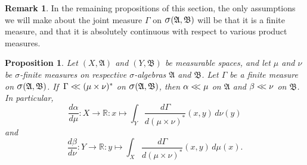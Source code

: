 \documentclass[
twoside=true,
paper=letter,
fontsize=9pt,
pagesize=auto,
leqno,
openany,
headsepline,
overfullrule,
]{scrbook}
\theoremstyle{plain}
\theoremstyle{plain}
\newtheorem{prop}[thm]{Proposition}
\theoremstyle{definition}
\newtheorem{rmk}[thm]{Remark}
\theoremstyle{bfnoteitalic}
\theoremstyle{bfnoteroman}
\newcommand{\sigalg}[1]{\mathfrak{#1}}
\newcommand{\sagb}{\mathop{\hbox{\large{$\sigma$}}}\nolimits}
\newcommand{\textsigma}{\hbox{\large{$\sigma$}}\kern-1pt}
\newcommand{\R}{\mathbb{R}}
\newcommand{\sigmaalgebra}{\sigalg{A}}
\newcommand{\sigmaalgebraii}{\sigalg{B}}
\newcommand{\productsig}[2]{\sagb(#1,#2)}
\newcommand{\measurespace}{X}
\newcommand{\measurespaceii}{Y}
\newcommand{\mspaceelt}{x}
\newcommand{\mspaceeltii}{y}
\newcommand{\abscont}{\mathrel{< \kern-3.5pt <}}
\newcommand{\measure}{\mu}
\newcommand{\measmu}{\mu}
\newcommand{\measureii}{\nu}
\newcommand{\measnu}{\nu}
\newcommand{\joint}{\Gamma}%
\newcommand{\measonprod}{\Gamma}%
\newcommand{\marginalone}{\alpha}%
\newcommand{\marginaltwo}{\beta}%
\begin{document}
\begin{rmk}
In the remaining propositions of this section,
the only assumptions we will make about the joint measure $\measonprod$ on $\productsig{\sigmaalgebra}{\sigmaalgebraii}$ will be that it is a finite measure, and that it is absolutely continuous with respect to various product measures.
\end{rmk}






\begin{prop}\label{reference_implies_marginals}
Let 
$(\measurespace, \sigmaalgebra)$
and
$(\measurespaceii, \sigmaalgebraii)$
be measurable spaces, and let $\measure$ and $\measureii$
be \textsigma-finite measures on respective \textsigma-algebras 
$\sigmaalgebra$ and $\sigmaalgebraii$.
Let $\measonprod$ be a finite measure on 
$\productsig{\sigmaalgebra}{\sigmaalgebraii}$. 
If $\,\measonprod \abscont (\measure\times\measureii)^*$ on
$\productsig{\sigmaalgebra}{\sigmaalgebraii}$, 
then 
$\marginalone\abscont\measure$
on $\sigmaalgebra$
and
$\marginaltwo\abscont\measureii$
on $\sigmaalgebraii$.
In particular,
\[
\frac{d \marginalone}
{d\measure}
: \measurespace\to\R :
\mspaceelt\mapsto
\int_{\measurespaceii}
\frac{d\joint}{d(\measmu\times\measnu)^*}
(\mspaceelt,\mspaceeltii)
\,d\measureii(\mspaceeltii)
\]
and
\[
\frac{d \marginaltwo}
{d\measureii}
: \measurespaceii\to\R :
\mspaceeltii\mapsto
\int_{\measurespace}
\frac{d\joint}{d(\measmu\times\measnu)^*}
(\mspaceelt,\mspaceeltii)\,d\measure(\mspaceelt).
\]
\end{prop}
\end{document}
